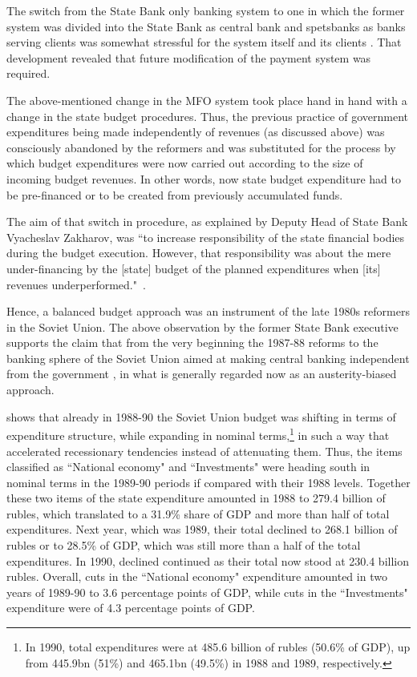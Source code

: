 The switch from the State Bank only banking system to one in which the former system was divided into the State Bank as central bank and spetsbanks as banks serving clients was somewhat stressful for the system itself and its clients \citep[pp.~20-21]{krotov2008b}. That development revealed that future modification of the payment system was required.

The above-mentioned change in the MFO system took place hand in hand with a change in the state budget procedures. Thus, the previous practice of government expenditures being made independently of revenues (as discussed above) was consciously abandoned by the reformers and was substituted for the process by which budget expenditures were now carried out according to the size of incoming budget revenues. In other words, now state budget expenditure had to be pre-financed or to be created from previously accumulated funds.

The aim of that switch in procedure, as explained by Deputy Head of State Bank Vyacheslav Zakharov, was ``to increase responsibility of the state financial bodies during the budget execution. However, that responsibility was about the mere under-financing by the [state] budget of the planned expenditures when [its] revenues underperformed."~\citep[p.~ 19]{krotov2008b}.

Hence, a balanced budget approach was an instrument of the late 1980s reformers in the Soviet Union. The above observation by the former State Bank executive supports the claim that from the very beginning the 1987-88 reforms to the banking sphere of the Soviet Union aimed at making central banking independent from the government \citep[p.~60]{fedorov1994}, in what is generally regarded now as an austerity-biased approach.

\cite[p. 40]{wallich1992} shows that already in 1988-90 the Soviet Union budget was shifting in terms of expenditure structure, while expanding in nominal terms,\footnote{In 1990, total expenditures were at 485.6 billion of rubles (50.6\% of GDP), up from 445.9bn (51\%) and 465.1bn (49.5\%) in 1988 and 1989, respectively.} in such a way that accelerated recessionary tendencies instead of attenuating them. Thus, the items classified as ``National economy" and ``Investments" were heading south in nominal terms in the 1989-90 periods if compared with their 1988 levels. Together these two items of the state expenditure amounted in 1988 to 279.4 billion of rubles, which translated to a 31.9\% share of GDP and more than half of total expenditures. Next year, which was 1989, their total declined to 268.1 billion of rubles or to 28.5\% of GDP, which was still more than a half of the total expenditures. In 1990, declined continued as their total now stood at 230.4 billion rubles. Overall, cuts in the ``National economy" expenditure amounted in two years of 1989-90 to 3.6 percentage points of GDP, while cuts in the ``Investments" expenditure were of 4.3 percentage points of GDP.

